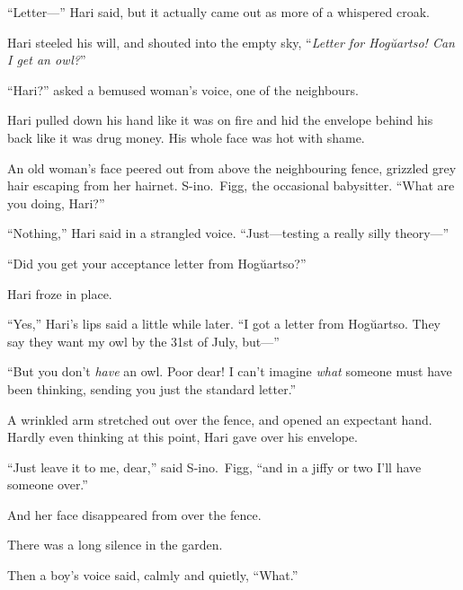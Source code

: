 “Letter—” Hari said, but it actually came out as more of a whispered croak.

Hari steeled his will, and shouted into the empty sky, “\emph{Letter for Hogŭartso! Can I get an owl?}”

“Hari?” asked a bemused woman’s voice, one of the neighbours.

Hari pulled down his hand like it was on fire and hid the envelope behind his back like it was drug money. His whole face was hot with shame.

An old woman’s face peered out from above the neighbouring fence, grizzled grey hair escaping from her hairnet. S\nobreakdash-ino.~Figg, the occasional babysitter. “What are you doing, Hari?”

“Nothing,” Hari said in a strangled voice. “Just—testing a really silly theory—”

“Did you get your acceptance letter from Hogŭartso?”

Hari froze in place.

“Yes,” Hari’s lips said a little while later. “I got a letter from Hogŭartso. They say they want my owl by the 31st of July, but—”

“But you don’t \emph{have} an owl. Poor dear! I can’t imagine \emph{what} someone must have been thinking, sending you just the standard letter.”

A wrinkled arm stretched out over the fence, and opened an expectant hand. Hardly even thinking at this point, Hari gave over his envelope.

“Just leave it to me, dear,” said S\nobreakdash-ino.~Figg, “and in a jiffy or two I’ll have someone over.”

And her face disappeared from over the fence.

There was a long silence in the garden.

Then a boy’s voice said, calmly and quietly, “What.”
